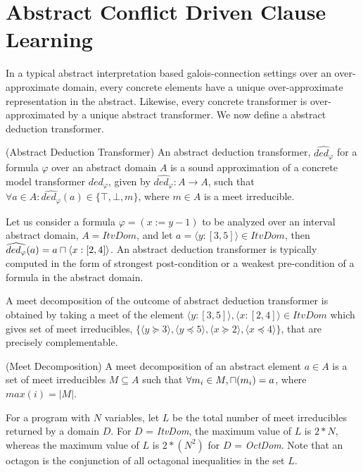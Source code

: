 \section{Abstract Conflict Driven Clause Learning}
In a typical abstract interpretation based galois-connection settings over 
an over-approximate domain, every concrete elements have a unique over-approximate 
representation in the abstract.  Likewise, every concrete transformer is
over-approximated by a unique abstract transformer.  We now define a abstract 
deduction transformer.  

\begin{definition}{(Abstract Deduction Transformer)} An abstract deduction
transformer, $\widehat{ded_{\varphi}}$ for a formula $\varphi$ over an abstract 
domain $A$ is a sound approximation of a concrete model transformer
$ded_{\varphi}$, given by $\widehat{ded_{\varphi}} : A \rightarrow A$, such that 
$\forall a \in A: \widehat{ded_{\varphi}}(a) \in \{\top, \bot, m\}$, where 
$m \in A$ is a meet irreducible.   
\end{definition}

Let us consider a formula $\varphi = (x:=y-1)$ to be analyzed over 
an interval abstract domain, $A = ItvDom$, and let $a = \langle y:[3, 5]
\rangle \in ItvDom$, then $\widehat{ded_{\varphi}}(a) = a \sqcap \langle x:[2, 4]
\rangle$.  An abstract deduction transformer is typically computed in the form 
of strongest post-condition or a weakest pre-condition of a formula in the 
abstract domain.  

A meet decomposition of the outcome of abstract deduction transformer 
is obtained by taking a meet of the element $\langle y:[3, 5] \rangle, 
\langle x:[2, 4] \rangle \in ItvDom$ which gives set of meet irreducibles, 
$\{ \langle y \succeq 3 \rangle, \langle y \preceq 5 \rangle, 
\langle x \succeq 2 \rangle, \langle x \preceq 4 \rangle \}$, that are 
precisely complementable.

\begin{definition}{(Meet Decomposition)} A meet decomposition of an abstract
element $a \in A$ is a set of meet irreducibles $M \subseteq A$ such that 
$\forall m_i \in M, \sqcap(m_i) = a$, where $max(i) = |M|$.
\end{definition}
 
For a program with $N$ variables, let $L$ be the total number of 
meet irreducibles returned by a domain $D$.  For $D$ = {\em ItvDom}, the 
maximum value of $L$ is $2*N$, whereas the maximum value of $L$ is 
$2*(N^2)$ for $D$ = {\em OctDom}. Note that an octagon is the conjunction 
of all octagonal inequalities in the set $L$.
